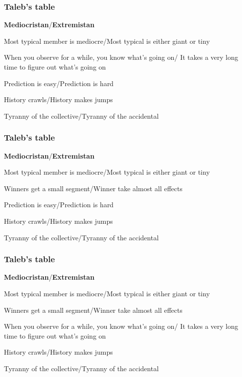 \begin{frame}
  \frametitle{Taleb's table}

{\small
  \textbf{Mediocristan}/\textbf{Extremistan}
  
  Most typical member is mediocre/Most typical is either giant or tiny


  \inv

  When you observe for a while, you know what's going on/
  It takes a very long time to figure out what's going on
  
  Prediction is easy/Prediction is hard

  History crawls/History makes jumps

  Tyranny of the collective/Tyranny of the accidental
}

\end{frame}

\begin{frame}
  \frametitle{Taleb's table}

{\small
  \textbf{Mediocristan}/\textbf{Extremistan}
  
  Most typical member is mediocre/Most typical is either giant or tiny

  Winners get a small segment/Winner take almost all effects 


  \inv

  Prediction is easy/Prediction is hard

  History crawls/History makes jumps

  Tyranny of the collective/Tyranny of the accidental
}


\end{frame}

\begin{frame}
  \frametitle{Taleb's table}

{\small
  \textbf{Mediocristan}/\textbf{Extremistan}
  
  Most typical member is mediocre/Most typical is either giant or tiny

  Winners get a small segment/Winner take almost all effects 

  When you observe for a while, you know what's going on/
  It takes a very long time to figure out what's going on
  

  \inv

  History crawls/History makes jumps

  Tyranny of the collective/Tyranny of the accidental
}

\end{frame}

